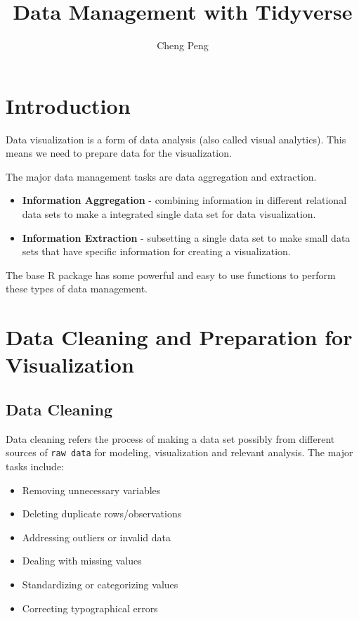 \documentclass[
]{article}
\title{Data Management with Tidyverse}
\author{Cheng Peng}
\date{}
\providecommand{\tightlist}{%
  \setlength{\itemsep}{0pt}\setlength{\parskip}{0pt}}
\begin{document}
\maketitle

{
\setcounter{tocdepth}{4}
\tableofcontents
}
\hypertarget{introduction}{%
\section{Introduction}\label{introduction}}

Data visualization is a form of data analysis (also called visual
analytics). This means we need to prepare data for the visualization.

The major data management tasks are data aggregation and extraction.

\begin{itemize}
\item
  \textbf{Information Aggregation} - combining information in different
  relational data sets to make a integrated single data set for data
  visualization.
\item
  \textbf{Information Extraction} - subsetting a single data set to make
  small data sets that have specific information for creating a
  visualization.
\end{itemize}

The base R package has some powerful and easy to use functions to
perform these types of data management.

\hypertarget{data-cleaning-and-preparation-for-visualization}{%
\section{Data Cleaning and Preparation for
Visualization}\label{data-cleaning-and-preparation-for-visualization}}

\hypertarget{data-cleaning}{%
\subsection{Data Cleaning}\label{data-cleaning}}

Data cleaning refers the process of making a data set possibly from
different sources of \texttt{raw\ data} for modeling, visualization and
relevant analysis. The major tasks include:

\begin{itemize}
\tightlist
\item
  Removing unnecessary variables
\item
  Deleting duplicate rows/observations
\item
  Addressing outliers or invalid data
\item
  Dealing with missing values
\item
  Standardizing or categorizing values
\item
  Correcting typographical errors
\end{itemize}
\end{document}
